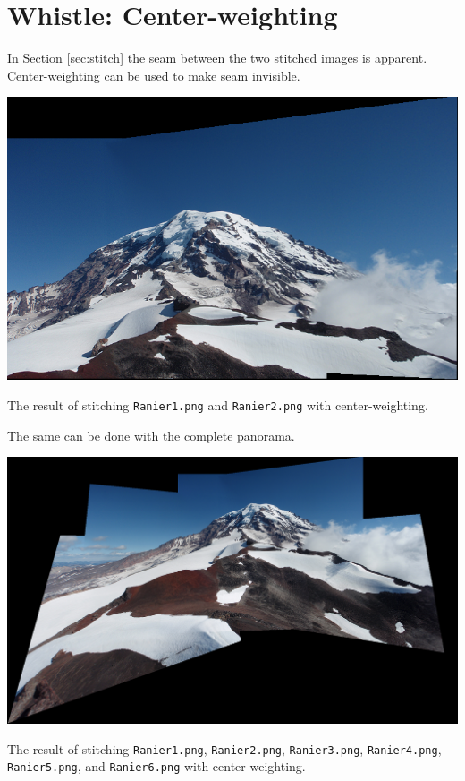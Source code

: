 \documentclass[letterpaper]{article}
\begin{document}
\section*{Whistle: Center-weighting}

In Section \ref{sec:stitch} the seam between the two stitched images is
apparent. Center-weighting can be used to make seam invisible.

\begin{center}
  \includegraphics[width=\textwidth]{4_center_weighted.png}
  
  The result of stitching \texttt{Ranier1.png} and \texttt{Ranier2.png} with
  center-weighting.
\end{center}

The same can be done with the complete panorama.

\begin{center}
  \includegraphics[width=\textwidth]{all_stitched_center_weighted.png}
  
  The result of stitching \texttt{Ranier1.png}, \texttt{Ranier2.png},
  \texttt{Ranier3.png}, \texttt{Ranier4.png}, \texttt{Ranier5.png}, and
  \texttt{Ranier6.png} with center-weighting.
\end{center}
\end{document}
